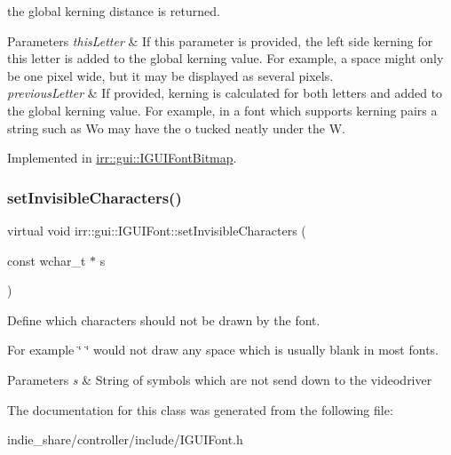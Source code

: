 the global kerning distance is returned. 
\begin{DoxyParams}{Parameters}
{\em this\+Letter} & If this parameter is provided, the left side kerning for this letter is added to the global kerning value. For example, a space might only be one pixel wide, but it may be displayed as several pixels. \\
\hline
{\em previous\+Letter} & If provided, kerning is calculated for both letters and added to the global kerning value. For example, in a font which supports kerning pairs a string such as \textquotesingle{}Wo\textquotesingle{} may have the \textquotesingle{}o\textquotesingle{} tucked neatly under the \textquotesingle{}W\textquotesingle{}. \\
\hline
\end{DoxyParams}


Implemented in \hyperlink{classirr_1_1gui_1_1IGUIFontBitmap_a7bdeaea45745a10e09f7769ec3b95a12}{irr\+::gui\+::\+I\+G\+U\+I\+Font\+Bitmap}.

\mbox{\label{classirr_1_1gui_1_1IGUIFont_acff05412dc954845add611c5f71cef49}} 
\subsubsection{\texorpdfstring{set\+Invisible\+Characters()}{setInvisibleCharacters()}}
{\footnotesize\ttfamily virtual void irr\+::gui\+::\+I\+G\+U\+I\+Font\+::set\+Invisible\+Characters (\begin{DoxyParamCaption}\item[{const wchar\+\_\+t $\ast$}]{s }\end{DoxyParamCaption})\hspace{0.3cm}{\ttfamily [pure virtual]}}



Define which characters should not be drawn by the font. 

For example \char`\"{} \char`\"{} would not draw any space which is usually blank in most fonts. 
\begin{DoxyParams}{Parameters}
{\em s} & String of symbols which are not send down to the videodriver \\
\hline
\end{DoxyParams}


The documentation for this class was generated from the following file\+:\begin{DoxyCompactItemize}
\item 
indie\+\_\+share/controller/include/I\+G\+U\+I\+Font.\+h\end{DoxyCompactItemize}
